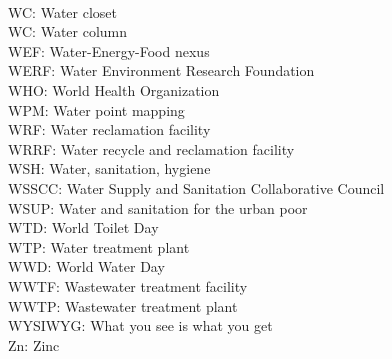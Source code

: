 \documentclass{article}
\begin{document}
\vspace{0.3cm}\\
WC:  Water closet
\vspace{0.3cm}\\
WC:  Water column
\vspace{0.3cm}\\
WEF:  Water-Energy-Food nexus
\vspace{0.3cm}\\
WERF:  Water Environment Research Foundation
\vspace{0.3cm}\\
WHO:  World Health Organization
\vspace{0.3cm}\\
WPM:  Water point mapping
\vspace{0.3cm}\\
WRF:  Water reclamation facility
\vspace{0.3cm}\\
WRRF:  Water recycle and reclamation facility
\vspace{0.3cm}\\
WSH:  Water, sanitation, hygiene
\vspace{0.3cm}\\
WSSCC:  Water Supply and Sanitation Collaborative Council
\vspace{0.3cm}\\
WSUP:  Water and sanitation for the urban poor
\vspace{0.3cm}\\
WTD:  World Toilet Day
\vspace{0.3cm}\\
WTP:  Water treatment plant
\vspace{0.3cm}\\
WWD:  World Water Day
\vspace{0.3cm}\\
WWTF:  Wastewater treatment facility
\vspace{0.3cm}\\
WWTP:  Wastewater treatment plant
\vspace{0.3cm}\\
WYSIWYG:  What you see is what you get
\vspace{0.3cm}\\
Zn:  Zinc
\end{document}
